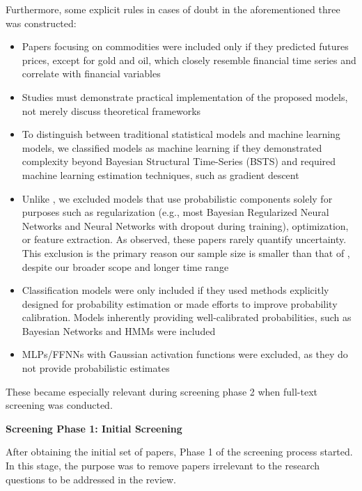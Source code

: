 Furthermore, some explicit rules in cases of doubt in the aforementioned three was constructed:
\begin{itemize}
    \item Papers focusing on commodities were included only if they predicted futures prices, except for gold and oil, which closely resemble financial time series and correlate with financial variables \parencite{Gokmenoglu2015}
    \item Studies must demonstrate practical implementation of the proposed models, not merely discuss theoretical frameworks
    \item To distinguish between traditional statistical models and machine learning models, we classified models as machine learning if they demonstrated complexity beyond Bayesian Structural Time-Series (BSTS) and required machine learning estimation techniques, such as gradient descent
    \item Unlike \textcite{Blasco_et_al_2024}, we excluded models that use probabilistic components solely for purposes such as regularization (e.g., most Bayesian Regularized Neural Networks and Neural Networks with dropout during training), optimization, or feature extraction. As \textcite{Blasco_et_al_2024} observed, these papers rarely quantify uncertainty. This exclusion is the primary reason our sample size is smaller than that of \textcite{Blasco_et_al_2024}, despite our broader scope and longer time range
    \item Classification models were only included if they used methods explicitly designed for probability estimation or made efforts to improve probability calibration. Models inherently providing well-calibrated probabilities, such as Bayesian Networks and HMMs were included
    \item MLPs/FFNNs with Gaussian activation functions were excluded, as they do not provide probabilistic estimates
\end{itemize}
These became especially relevant during screening phase 2 when full-text screening was conducted. 

\textbf{Screening Phase 1: Initial Screening}\nopagebreak

After obtaining the initial set of papers, Phase 1 of the screening process started. In this stage, the purpose was to remove papers irrelevant to the research questions to be addressed in the review.

